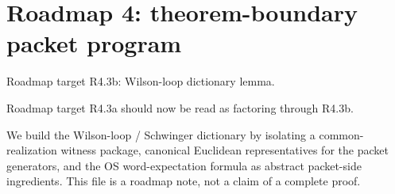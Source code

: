 \section*{Roadmap 4: theorem-boundary packet program}
Roadmap target R4.3b: Wilson-loop dictionary lemma.

Roadmap target R4.3a should now be read as factoring through R4.3b.

We build the Wilson-loop / Schwinger dictionary by isolating a common-realization witness package, canonical Euclidean representatives for the packet generators, and the OS word-expectation formula as abstract packet-side ingredients. This file is a roadmap note, not a claim of a complete proof.
\endinput
